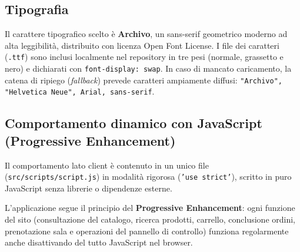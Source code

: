 \documentclass[a4paper,11pt]{article}
\begin{document}
\subsection{Tipografia}
Il carattere tipografico scelto è \textbf{Archivo}, un sans-serif geometrico moderno ad alta leggibilità, distribuito con licenza Open Font License. I file dei caratteri (\texttt{.ttf}) sono inclusi localmente nel repository in tre pesi (normale, grassetto e nero) e dichiarati con \texttt{font-display: swap}. In caso di mancato caricamento, la catena di ripiego (\textit{fallback}) prevede caratteri ampiamente diffusi: \texttt{"Archivo", "Helvetica Neue", Arial, sans-serif}.

\subsection{Comportamento dinamico con JavaScript (Progressive Enhancement)}
Il comportamento lato client è contenuto in un unico file (\texttt{src/scripts/script.js}) in modalità rigorosa (\texttt{'use strict'}), scritto in puro JavaScript senza librerie o dipendenze esterne.

L'applicazione segue il principio del \textbf{Progressive Enhancement}: ogni funzione del sito (consultazione del catalogo, ricerca prodotti, carrello, conclusione ordini, prenotazione sala e operazioni del pannello di controllo) funziona regolarmente anche disattivando del tutto JavaScript nel browser.
\end{document}
